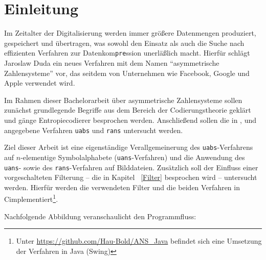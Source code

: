 \documentclass[a4paper,12pt]{article}
\newcommand{\CC}{C\nolinebreak\hspace{-.05em}\raisebox{.4ex}{\tiny\bf+}\nolinebreak\hspace{-.10em}\raisebox{.4ex}{\tiny\bf+}\;}
\begin{document}
\newpage
\tableofcontents
\pagebreak
\section{Einleitung}
Im Zeitalter der Digitalisierung werden immer größere Datenmengen produziert, gespeichert und übertragen, was sowohl den Einsatz als auch die Suche nach effizienten Verfahren zur Datenkom{\tt{pre}}ssion unerläßlich macht.
Hierfür schlägt Jaroslaw Duda\cite{Duda} ein neues Verfahren mit dem Namen "`asymmetrische Zahlensysteme"' vor, das seitdem von Unternehmen wie Facebook\cite{fb}, Google\cite{google} und Apple\cite{apple} verwendet wird. 
\par
Im Rahmen dieser Bachelorarbeit über asymmetrische Zahlensysteme sollen zunächst grundlegende Begriffe aus dem Bereich der Codierungstheorie geklärt und gänge Entropiecodierer besprochen werden.
Anschließend sollen die in \cite{Giesen}, \cite{Duda} und \cite{Krajcevski} angegebene Verfahren {\tt{uabs}} und {\tt{rans}} untersucht werden.
\par
Ziel dieser Arbeit ist eine eigenständige Verallgemeinerung des {\tt{uabs}}-Verfahrens auf $n$-elementige Symbolalphabete ({\tt{uans}}-Verfahren) und die Anwendung des  {\tt{uans}}- sowie des {\tt{rans}}-Verfahren auf Bilddateien. Zusätzlich soll der Einfluss einer vorgeschalteten Filterung -- die in Kapitel ~\ref{Filter} besprochen wird -- untersucht werden. Hierfür werden die verwendeten Filter und die beiden Verfahren in \CC implementiert\footnote{Unter \url{https://github.com/Hau-Bold/ANS_Java} befindet sich eine Umsetzung der Verfahren in Java (Swing)}. 
\par
\vspace{0.5cm}
Nachfolgende Abbildung veranschaulicht den Programmfluss:
\end{document}
